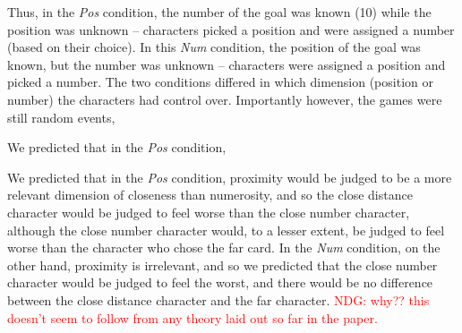 \documentclass[10pt,letterpaper]{article}
\newcommand{\red}[1]{\textcolor{Red}{#1}}
\begin{document}
Thus, in the \textit{Pos} condition, the number of the goal was known (10) while the position was unknown -- characters picked a position and were assigned a number (based on their choice). In this \textit{Num} condition, the position of the goal was known, but the number was unknown -- characters were assigned a position and picked a number. The two conditions differed in which dimension (position or number) the characters had control over. Importantly however, the games were still random events, %

We predicted that in the \textit{Pos} condition,

We predicted that in the \textit{Pos} condition, proximity would be judged to be a more relevant dimension of closeness than numerosity, and so the close distance character would be judged to feel worse than the close number character, although the close number character would, to a lesser extent, be judged to feel worse than the character who chose the far card. In the \textit{Num} condition, on the other hand, proximity is irrelevant, and so we predicted that the close number character would be judged to feel the worst, and there would be no difference between the close distance character and the far character. \red{NDG: why?? this doesn't seem to follow from any theory laid out so far in the paper.}





\end{document}
